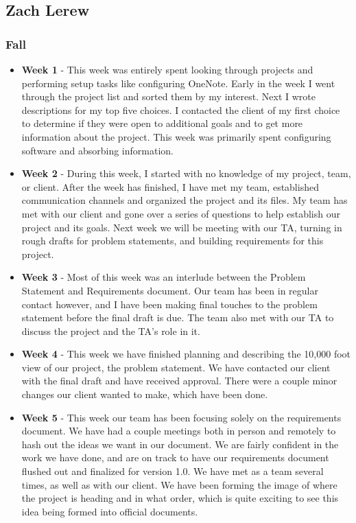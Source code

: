 \documentclass[onecolumn, draftclsnofoot,10pt, compsoc]{IEEEtran}
\begin{document}
		\subsection{Zach Lerew}
			\subsubsection{Fall}
				\begin{itemize}
					\item \textbf{Week 1} - This week was entirely spent looking through projects and performing setup tasks like configuring OneNote. Early in the week I went through the project list and sorted them by my interest. Next I wrote descriptions for my top five choices. I contacted the client of my first choice to determine if they were open to additional goals and to get more information about the project. This week was primarily spent configuring software and absorbing information. 
					\item \textbf{Week 2} - During this week, I started with no knowledge of my project, team, or client. After the week has finished, I have met my team, established communication channels and organized the project and its files. My team has met with our client and gone over a series of questions to help establish our project and its goals. Next week we will be meeting with our TA, turning in rough drafts for problem statements, and building requirements for this project. 
					\item \textbf{Week 3} - Most of this week was an interlude between the Problem Statement and Requirements document. Our team has been in regular contact however, and I have been making final touches to the problem statement before the final draft is due. The team also met with our TA to discuss the project and the TA's role in it. 
					\item \textbf{Week 4} - This week we have finished planning and describing the 10,000 foot view of our project, the problem statement. We have contacted our client with the final draft and have received approval. There were a couple minor changes our client wanted to make, which have been done. 
					\item \textbf{Week 5} - This week our team has been focusing solely on the requirements document. We have had a couple meetings both in person and remotely to hash out the ideas we want in our document. We are fairly confident in the work we have done, and are on track to have our requirements document flushed out and finalized for version 1.0. We have met as a team several times, as well as with our client. We have been forming the image of where the project is heading and in what order, which is quite exciting to see this idea being formed into official documents. 

\end{itemize}
\end{document}
